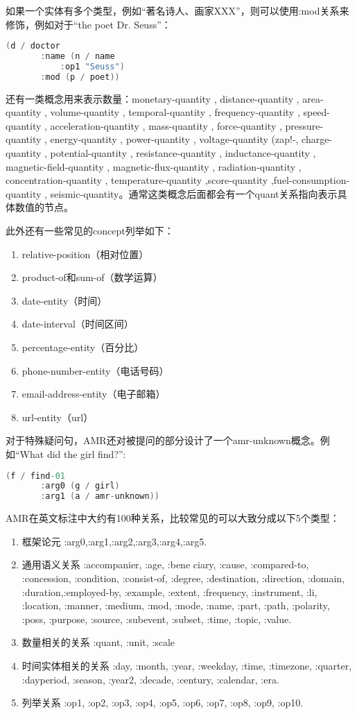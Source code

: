 \documentclass[master, winfont]{njuthesis}
\begin{document}
如果一个实体有多个类型，例如“著名诗人、画家XXX”，则可以使用:mod关系来修饰，例如对于“the poet Dr. Seuss”：
\begin{lstlisting}[language=C]
   (d / doctor
       :name (n / name
           :op1 "Seuss")
       :mod (p / poet))
\end{lstlisting}

还有一类概念用来表示数量：monetary-quantity , distance-quantity , area-quantity , volume-quantity , temporal-quantity , frequency-quantity , speed-quantity , acceleration-quantity , mass-quantity , force-quantity , pressure-quantity , energy-quantity , power-quantity , voltage-quantity (zap!-, charge-quantity , potential-quantity , resistance-quantity , inductance-quantity , magnetic-field-quantity , magnetic-flux-quantity , radiation-quantity , concentration-quantity , temperature-quantity ,score-quantity ,fuel-consumption-quantity , seismic-quantity。通常这类概念后面都会有一个quant关系指向表示具体数值的节点。

此外还有一些常见的concept列举如下：
\begin{enumerate}
	\item relative-position（相对位置）
	\item product-of和sum-of（数学运算）
	\item date-entity（时间）
	\item date-interval（时间区间）
	\item percentage-entity（百分比）
	\item phone-number-entity（电话号码）
	\item email-address-entity（电子邮箱）
	\item url-entity（url）
\end{enumerate}

对于特殊疑问句，AMR还对被提问的部分设计了一个amr-unknown概念。例如“What did the girl find?”:
\begin{lstlisting}[language=C]
   (f / find-01
       :arg0 (g / girl)
       :arg1 (a / amr-unknown))
\end{lstlisting}

AMR在英文标注中大约有100种关系，比较常见的可以大致分成以下5个类型：
\begin{enumerate}
	\item 框架论元 :arg0,:arg1,:arg2,:arg3,:arg4,:arg5.
	\item 通用语义关系 :accompanier, :age, :bene ciary, :cause, :compared-to, :concession, :condition, :consist-of, :degree, :destination, :direction, :domain, :duration,:employed-by, :example, :extent, :frequency, :instrument, :li, :location, :manner, :medium, :mod, :mode, :name, :part, :path, :polarity, :poss, :purpose, :source, :subevent, :subset, :time, :topic, :value.
	\item 数量相关的关系 :quant, :unit, :scale
	\item 时间实体相关的关系 :day, :month, :year, :weekday, :time, :timezone, :quarter, :dayperiod, :season, :year2, :decade, :century, :calendar, :era.
	\item 列举关系 :op1, :op2, :op3, :op4, :op5, :op6, :op7, :op8, :op9,
:op10.
\end{enumerate}
\end{document}
